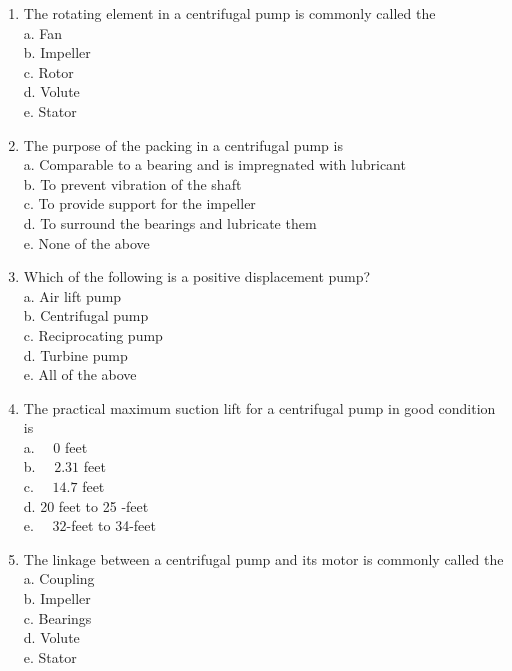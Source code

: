 \documentclass{article}
\begin{document}
\begin{enumerate}[1.]
  \item The rotating element in a centrifugal pump is commonly called the\\
a. Fan\\

b. Impeller\\

c. Rotor\\

d. Volute\\

e. Stator\\

\item The purpose of the packing in a centrifugal pump is\\

a. Comparable to a bearing and is impregnated with lubricant\\

b. To prevent vibration of the shaft\\

c. To provide support for the impeller\\

d. To surround the bearings and lubricate them\\

e. None of the above\\

  \item Which of the following is a positive displacement pump?\\
a. Air lift pump\\
b. Centrifugal pump\\
c. Reciprocating pump\\
d. Turbine pump\\
e. All of the above

\item The practical maximum suction lift for a centrifugal pump in good condition is \\

a. $\quad 0$ feet\\

b. $\quad 2.31$ feet\\

c. $\quad 14.7$ feet\\

d. 20 feet to 25 -feet\\

e. $\quad 32$-feet to 34-feet

 \item The linkage between a centrifugal pump and its motor is commonly called the\\
a. Coupling\\
b. Impeller\\
c. Bearings\\
d. Volute\\
e. Stator


\end{enumerate}
\end{document}
